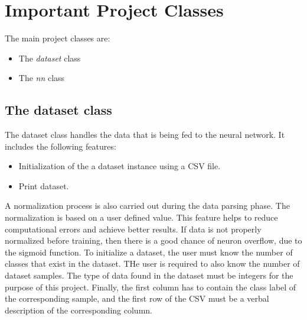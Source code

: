 \section{Important Project Classes}

The main project classes are:
\begin{itemize}
\item The \emph{dataset} class
\item The \emph{nn} class
\end{itemize}

\subsection{The dataset class}

The dataset class handles the data that is being fed to the neural network. It includes the following features:
\begin{itemize}
\item Initialization of the a dataset instance using a CSV file.
\item Print dataset.
\end{itemize}

A normalization process is also carried out during the data parsing phase. The normalization is based on a user defined value. This feature helps to reduce computational errors and achieve better results. If data is not properly normalized before training, then there is a good chance of neuron overflow, due to the sigmoid function. To initialize a dataset, the user must know the number of classes that exist in the dataset. THe user is required to also know the number of dataset samples. The type of data found in the dataset must be integers for the purpose of this project. Finally, the first column has to contain the class label of the corresponding sample, and the first row of the CSV must be a verbal description of the corresponding column.

